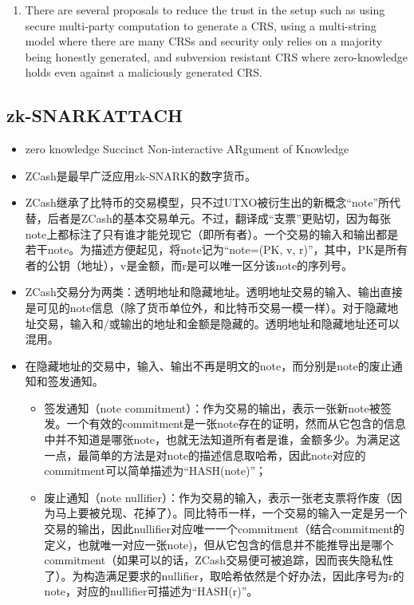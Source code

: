 \documentclass[11pt]{article}
\begin{document}
\begin{enumerate}
\item There are several proposals to reduce the trust in the setup such as using secure multi-party computation to generate a CRS, using a multi-string model where there are many CRSs and security only relies on a majority being honestly generated, and subversion resistant CRS where zero-knowledge holds even against a maliciously generated CRS.
\end{enumerate}
\subsection{zk-SNARK\hfill{}\textsc{ATTACH}}
\label{sec:org4ec2bff}
\begin{itemize}
\item zero knowledge Succinct Non-interactive ARgument of Knowledge
\item ZCash是最早广泛应用zk-SNARK的数字货币。
\item ZCash继承了比特币的交易模型，只不过UTXO被衍生出的新概念“note”所代替，后者是ZCash的基本交易单元。不过，翻译成“支票”更贴切，因为每张note上都标注了只有谁才能兑现它（即所有者）。一个交易的输入和输出都是若干note。为描述方便起见，将note记为“note=(PK, v, r)”，其中，PK是所有者的公钥（地址），v是金额，而r是可以唯一区分该note的序列号。
\item ZCash交易分为两类：透明地址和隐藏地址。透明地址交易的输入、输出直接是可见的note信息（除了货币单位外，和比特币交易一模一样）。对于隐藏地址交易，输入和/或输出的地址和金额是隐藏的。透明地址和隐藏地址还可以混用。
\item 在隐藏地址的交易中，输入、输出不再是明文的note，而分别是note的废止通知和签发通知。
\begin{itemize}
\item 签发通知（note commitment）：作为交易的输出，表示一张新note被签发。一个有效的commitment是一张note存在的证明，然而从它包含的信息中并不知道是哪张note，也就无法知道所有者是谁，金额多少。为满足这一点，最简单的方法是对note的描述信息取哈希，因此note对应的commitment可以简单描述为“HASH(note)”；
\item 废止通知（note nullifier）：作为交易的输入，表示一张老支票将作废（因为马上要被兑现、花掉了）。同比特币一样，一个交易的输入一定是另一个交易的输出，因此nullifier对应唯一一个commitment（结合commitment的定义，也就唯一对应一张note)，但从它包含的信息并不能推导出是哪个commitment（如果可以的话，ZCash交易便可被追踪，因而丧失隐私性了）。为构造满足要求的nullifier，取哈希依然是个好办法，因此序号为r的note，对应的nullifier可描述为“HASH(r)”。
\end{itemize}

\end{itemize}
\end{document}
